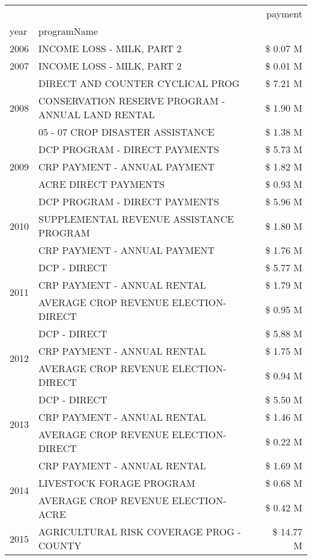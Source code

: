 \begin{tabular}{llr}
\toprule
 &  & payment \\
year & programName &  \\
\midrule
2006 & INCOME LOSS - MILK, PART 2 & \$ 0.07 M \\
\cline{1-3}
2007 & INCOME LOSS - MILK, PART 2 & \$ 0.01 M \\
\cline{1-3}
\multirow[t]{3}{*}{2008} & DIRECT AND COUNTER CYCLICAL PROG & \$ 7.21 M \\
 & CONSERVATION RESERVE PROGRAM - ANNUAL LAND RENTAL & \$ 1.90 M \\
 & 05 - 07 CROP DISASTER ASSISTANCE & \$ 1.38 M \\
\cline{1-3}
\multirow[t]{3}{*}{2009} & DCP PROGRAM - DIRECT PAYMENTS & \$ 5.73 M \\
 & CRP PAYMENT - ANNUAL PAYMENT & \$ 1.82 M \\
 & ACRE DIRECT PAYMENTS & \$ 0.93 M \\
\cline{1-3}
\multirow[t]{3}{*}{2010} & DCP PROGRAM - DIRECT PAYMENTS & \$ 5.96 M \\
 & SUPPLEMENTAL REVENUE ASSISTANCE PROGRAM & \$ 1.80 M \\
 & CRP PAYMENT - ANNUAL PAYMENT & \$ 1.76 M \\
\cline{1-3}
\multirow[t]{3}{*}{2011} & DCP - DIRECT & \$ 5.77 M \\
 & CRP PAYMENT - ANNUAL RENTAL & \$ 1.79 M \\
 & AVERAGE CROP REVENUE ELECTION-DIRECT & \$ 0.95 M \\
\cline{1-3}
\multirow[t]{3}{*}{2012} & DCP - DIRECT & \$ 5.88 M \\
 & CRP PAYMENT - ANNUAL RENTAL & \$ 1.75 M \\
 & AVERAGE CROP REVENUE ELECTION-DIRECT & \$ 0.94 M \\
\cline{1-3}
\multirow[t]{3}{*}{2013} & DCP - DIRECT & \$ 5.50 M \\
 & CRP PAYMENT - ANNUAL RENTAL & \$ 1.46 M \\
 & AVERAGE CROP REVENUE ELECTION-DIRECT & \$ 0.22 M \\
\cline{1-3}
\multirow[t]{3}{*}{2014} & CRP PAYMENT - ANNUAL RENTAL & \$ 1.69 M \\
 & LIVESTOCK FORAGE PROGRAM & \$ 0.68 M \\
 & AVERAGE CROP REVENUE ELECTION-ACRE & \$ 0.42 M \\
\cline{1-3}
\multirow[t]{3}{*}{2015} & AGRICULTURAL RISK COVERAGE PROG - COUNTY & \$ 14.77 M \\

\end{tabular}
